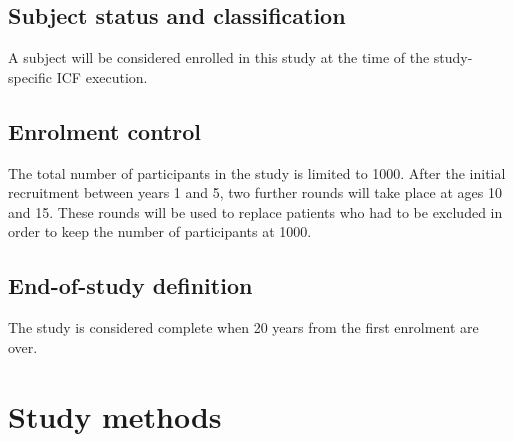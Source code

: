 \subsection{Subject status and classification}
A subject will be considered enrolled in this study at the time of the study-specific \ac{ICF} execution.

\subsection{Enrolment control}
The total number of participants in the study is limited to 1000. After the initial recruitment between years 1 and 5, two further rounds will take place at ages 10 and 15. These rounds will be used to replace patients who had to be excluded in order to keep the number of participants at \SI{1000}{}.

\subsection{End-of-study definition}
The study is considered complete when 20 years from the first enrolment are over.

\section{Study methods}
